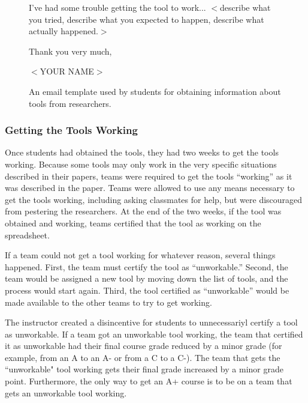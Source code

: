 \documentclass[10pt,conference]{IEEEtran}
\begin{document}
\begin{figure}[t]
{\begin{minipage}{\dimexpr\linewidth-2\fboxrule-2\fboxsep}
\vspace{1mm}\noindent
I've had some trouble getting the tool to work... $<$describe what you tried, describe what you 
expected to happen, describe what actually happened.$>$

\vspace{2mm}\noindent
Thank you very much,

\vspace{1mm}\noindent
$<$YOUR NAME$>$
\end{minipage}}

\caption{An email template used by students for obtaining information about tools from researchers.}\label{fig:email}

\end{figure}


\subsubsection{Getting the Tools Working}

Once students had obtained the tools, they had two weeks to get 
the tools working.
Because some tools may only work in the very specific situations 
described in their papers,
teams were required to get the tools ``working'' as it was described
in the paper.
Teams were allowed to use any means necessary to get the tools working,
including asking classmates for help, but were discouraged from
pestering the researchers.
At the end of the two weeks, if the tool was obtained and working,
teams certified that the tool as working on the spreadsheet.

If a team could not get a tool working for whatever reason, 
several things happened.
First, the team must certify the tool as ``unworkable.''
Second, the team would be assigned a new tool by moving down the list
of tools, and the process would start again.
Third, the tool certified as ``unworkable'' would be made available 
to the other teams to try to get working.

The instructor created a disincentive for students to unnecessariyl 
certify a tool as unworkable.
If a team got an unworkable tool working, the team that certified it as  
unworkable had their final course grade reduced by a minor 
grade (for example, from an A to an A- or from a C to a C-).
The team that gets the ``unworkable" tool working gets their final grade increased
by a minor grade point.
Furthermore, the only way to get an A+ course is to be on a team
that gets an unworkable tool working.
\end{document}
